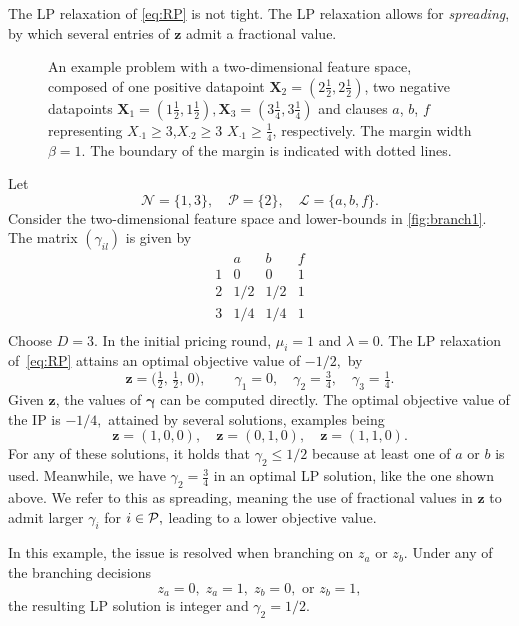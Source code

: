 The LP relaxation of \eqref{eq:RP} is not tight.
The LP relaxation allows for \emph{spreading}, by which several entries of $\bm{z}$ admit a fractional value.
\begin{example}[Spreading]\label{ex:branch1}
    \begin{figure}
        
        \caption{
            An example problem with a two-dimensional feature space, composed of one positive datapoint $\bm{X}_2 = (2\tfrac{1}{2}, 2\tfrac{1}{2})$, two negative datapoints $\bm{X}_1 = (1\tfrac{1}{2}, 1\tfrac{1}{2}), \bm{X}_3 = (3\tfrac{1}{4}, 3\tfrac{1}{4})$ and clauses $a$, $b$, $f$ representing $X_{\cdot 1} \geq 3$,$X_{\cdot 2} \geq 3$ $X_{\cdot 1} \geq \tfrac{1}{4}$, respectively.
            The margin width $\beta=1.$
            The boundary of the margin is indicated with dotted lines.}
        \label{fig:branch1}
    \end{figure}
    Let
    \[
        \mathcal{N} = \{1, 3\}, \quad \mathcal{P} = \{2\}, \quad
        \mathcal{L} = \{a, b, f\}.
    \]
    Consider the two-dimensional feature space and lower-bounds in \autoref{fig:branch1}.
    The matrix $(\gamma_{il})$ is given by
    \[
        \begin{array}{c|ccc}
            & a    & b    & f \\
            \hline
            1 & 0    & 0    & 1 \\
            2 & 1/2  & 1/2  & 1 \\
            3 & 1/4  & 1/4  & 1 \\
        \end{array}
    \]
    Choose $D = 3.$ In the initial pricing round, $\mu_i = 1$ and $\lambda = 0$.
    The LP relaxation of~\eqref{eq:RP} attains an optimal objective value of $-1/2,$
    by
    \[
        \bm{z} = \bigl(\tfrac{1}{2},\, \tfrac{1}{2},\, 0\bigr), \qquad
        \gamma_1 = 0, \quad \gamma_2 = \tfrac{3}{4}, \quad \gamma_3 = \tfrac{1}{4}.
    \]
    Given $\bm{z}$, the values of $\bm{\gamma}$ can be computed directly.
    The optimal objective value of the IP is $-1/4, $ attained by several solutions, examples being
    \[\bm{z}=(1,0,0), \quad \bm{z}=(0,1,0), \quad \bm{z}=(1,1,0).\]
    For any of these solutions, it holds that $\gamma_2 \leq 1/2$ because at least one of $a$ or $b$ is used.
    Meanwhile, we have $\gamma_2 = \frac{3}{4}$ in an optimal LP solution, like the one shown above.
    We refer to this as spreading, meaning the use of fractional values in $\bm{z}$ to admit larger $\gamma_i$ for $i \in \P,$ leading to a lower objective value.

    In this example, the issue is resolved when branching on $z_a$ or $z_b$.
    Under any of the branching decisions
    \[z_a = 0,\; z_a = 1,\; z_b = 0, \text{ or } z_b = 1,\]
    the resulting LP solution is integer and $\gamma_2 = 1/2.$
\end{example}

